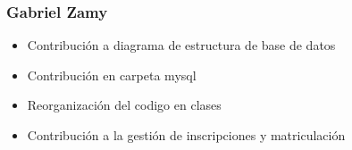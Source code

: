 \documentclass[
]{article}
\providecommand{\tightlist}{%
  \setlength{\itemsep}{0pt}\setlength{\parskip}{0pt}}
\begin{document}
\subsubsection{Gabriel Zamy}\label{gabriel-zamy}

\begin{itemize}
\tightlist
\item
  Contribución a diagrama de estructura de base de datos
\item
  Contribución en carpeta mysql
\item
  Reorganización del codigo en clases
\item
  Contribución a la gestión de inscripciones y matriculación
\end{itemize}
\end{document}
